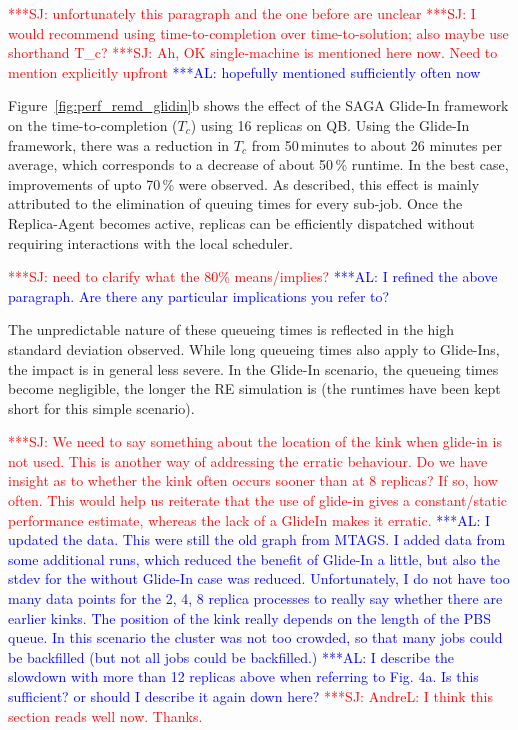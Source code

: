 \documentclass{rspublic}
\newcommand{\alnote}[1]{ {\textcolor{blue} { ***AL: #1 }}}
\newcommand{\jhanote}[1]{ {\textcolor{red} { ***SJ: #1 }}}
\newcommand{\alnote}[1]{}
\newcommand{\jhanote}[1]{}
\begin{document}
\jhanote{unfortunately this paragraph and the one before are unclear}
\jhanote{I would recommend using time-to-completion over
  time-to-solution; also maybe use shorthand T\_c?}  \jhanote{Ah, OK
  single-machine is mentioned here now. Need to mention explicitly
  upfront} \alnote{hopefully mentioned sufficiently often now}

Figure~\ref{fig:perf_remd_glidin}b shows the effect of the SAGA
Glide-In framework on the time-to-completion ($T_{c}$) using 16
replicas on QB.  Using the Glide-In framework, there was a reduction
in $T_{c}$ from 50\,minutes to about 26 minutes per average, which
corresponds to a decrease of about 50\,\% runtime.  In the best case,
improvements of upto 70\,\% were observed. As described, this effect
is mainly attributed to the elimination of queuing times for every
sub-job. Once the Replica-Agent becomes active, replicas can be
efficiently dispatched without requiring interactions with the local
scheduler.

\jhanote{need to clarify what the 80\% means/implies?} \alnote{I
  refined the above paragraph. Are there any particular implications
  you refer to?}

The unpredictable nature of these queueing times is reflected in the
high standard deviation observed. While long queueing times also apply
to Glide-Ins, the impact is in general less severe.  In the Glide-In
scenario, the queueing times become negligible, the longer the RE
simulation is (the runtimes have been kept short for this simple
scenario).

\jhanote{We need to say something about the location of the kink when
  glide-in is not used. This is another way of addressing the erratic
  behaviour. Do we have insight as to whether the kink often occurs
  sooner than at 8 replicas? If so, how often.  This would help us
  reiterate that the use of glide-in gives a constant/static
  performance estimate, whereas the lack of a GlideIn makes it
  erratic.}  \alnote{I updated the data. This were still the old graph
  from MTAGS. I added data from some additional runs, which reduced
  the benefit of Glide-In a little, but also the stdev for the without
  Glide-In case was reduced. Unfortunately, I do not have too many
  data points for the 2, 4, 8 replica processes to really say whether
  there are earlier kinks.  The position of the kink really depends on
  the length of the PBS queue. In this scenario the cluster was not
  too crowded, so that many jobs could be backfilled (but not all jobs
  could be backfilled.)}  \alnote{I describe the slowdown with more
  than 12 replicas above when referring to Fig. 4a. Is this
  sufficient? or should I describe it again down here?}
\jhanote{AndreL: I think this section reads well now. Thanks.}
\end{document}
